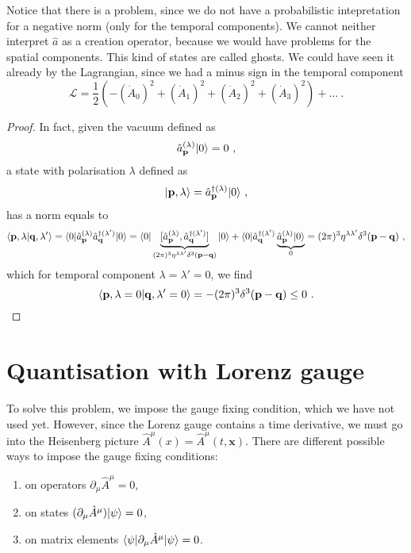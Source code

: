     Notice that there is a problem, since we do not have a probabilistic intepretation for a negative norm (only for the temporal components). We cannot neither interpret $\hat a$ as a creation operator, because we would have problems for the spatial components. This kind of states are called ghosts. We could have seen it already by the Lagrangian, since we had a minus sign in the temporal component
    \begin{equation*}
        \mathcal L = \frac{1}{2} (- (\dot A_0)^2 + (\dot A_1)^2 + (\dot A_2)^2 +(\dot A_3)^2 ) + \ldots ~.
    \end{equation*}
    \begin{proof}
        In fact, given the vacuum defined as 
        \begin{equation*}
            \hat a^{(\lambda)}_{\mathbf p} \vert0\rangle = 0 ~,
        \end{equation*}
        a state with polarisation $\lambda$ defined as 
        \begin{equation*}
            \vert\mathbf p, \lambda\rangle = \hat a^{\dagger (\lambda)}_{\mathbf p} \vert0\rangle ~,
        \end{equation*}
        has a norm equals to
        \begin{equation*}
            \langle\mathbf p, \lambda\vert\mathbf q, \lambda'\rangle = \langle0\vert \hat a^{(\lambda)}_{\mathbf p} \hat a^{\dagger (\lambda')}_{\mathbf q} \vert0\rangle = \langle0\vert \underbrace{[\hat a^{(\lambda)}_{\mathbf p}, \hat a^{\dagger (\lambda')}_{\mathbf q}] }_{(2\pi)^3 \eta^{\lambda \lambda'} \delta^3 (\mathbf p - \mathbf q)} \vert0\rangle + \langle0\vert \hat a^{\dagger (\lambda')}_{\mathbf q} \underbrace{\hat a^{(\lambda)}_{\mathbf p} \vert0\rangle}_0 = (2\pi)^3 \eta^{\lambda \lambda'} \delta^3 (\mathbf p - \mathbf q) ~,
        \end{equation*}
        which for temporal component $\lambda = \lambda' = 0$, we find
        \begin{equation*}
            \langle\mathbf p, \lambda=0\vert\mathbf q, \lambda'=0\rangle = - (2\pi)^3 \delta^3 (\mathbf p - \mathbf q) \leq 0 ~.
        \end{equation*}
    \end{proof}

\section{Quantisation with Lorenz gauge}

    To solve this problem, we impose the gauge fixing condition, which we have not used yet. However, since the Lorenz gauge contains a time derivative, we must go into the Heisenberg picture $\hat A^\mu (x) = \hat A^\mu (t, \mathbf x)$. There are different possible ways to impose the gauge fixing conditions:
    \begin{enumerate}
        \item on operators $\partial_\mu \hat A^\mu = 0$, 
        \item on states $(\partial_\mu \hat A^\mu) \vert\psi\rangle = 0$, 
        \item on matrix elements $\langle\psi\vert \partial_\mu \hat A^\mu \vert\psi\rangle = 0$.
    \end{enumerate}


